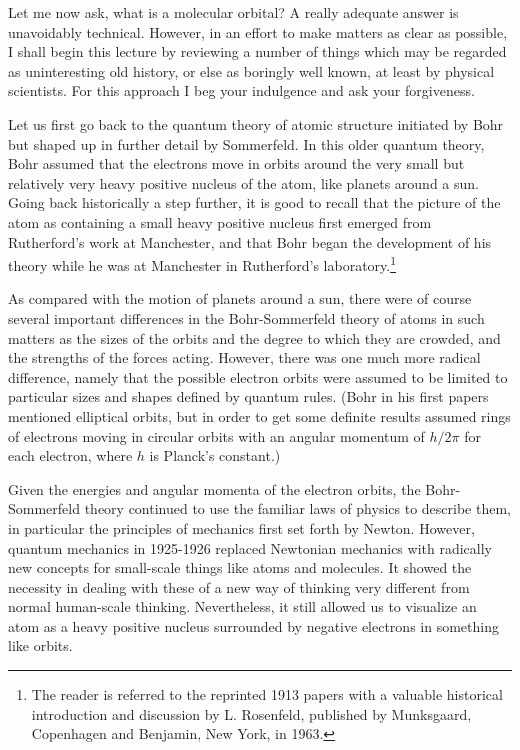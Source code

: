 \documentclass[11pt]{memoir}
\begin{document}
Let me now ask, what is a molecular orbital? A really adequate answer is unavoidably technical.  However, in an effort to make matters as clear as possible, I shall begin this lecture by reviewing a number of things which may be regarded as uninteresting old history, or else as boringly well known, at least by physical scientists.  For this approach I beg your indulgence and ask your forgiveness.

Let us first go back to the quantum theory of atomic structure initiated by Bohr but shaped up in further detail by Sommerfeld.  In this older quantum theory, Bohr assumed that the electrons move in orbits around the very small but relatively very heavy positive nucleus of the atom, like planets around a sun.  Going back historically a step further, it is good to recall that the picture of the atom as containing a small heavy positive nucleus first emerged from Rutherford's work at Manchester, and that Bohr began the development of his theory while he was at Manchester in Rutherford's laboratory.\footnote{The reader is referred to the reprinted 1913 papers with a valuable historical introduction and discussion by L. Rosenfeld, published by Munksgaard, Copenhagen and Benjamin, New York, in 1963.}

As compared with the motion of planets around a sun, there were of course several important differences in the Bohr-Som\-mer\-feld theory of atoms in such matters as the sizes of the orbits and the degree to which they are crowded, and the strengths of the forces acting.  However, there was one much more radical difference, namely that the possible electron orbits were assumed to be limited to particular sizes and shapes defined by quantum rules.  (Bohr in his first papers mentioned elliptical orbits, but in order to get some definite results assumed rings of electrons moving in circular orbits with an angular momentum of $h/2\pi$ for each electron, where $h$ is Planck's constant.)

Given the energies and angular momenta of the electron orbits, the Bohr-Sommerfeld theory continued to use the familiar laws of physics to describe them, in particular the principles of mechanics first set forth by Newton.  However, quantum mechanics in 1925-1926 replaced Newtonian mechanics with radically new concepts for small-scale things like atoms and molecules.  It showed the necessity in dealing with these of a new way of thinking very different from normal human-scale thinking.  Nevertheless, it still allowed us to visualize an atom as a heavy positive nucleus surrounded by negative electrons in something like orbits.
\end{document}

